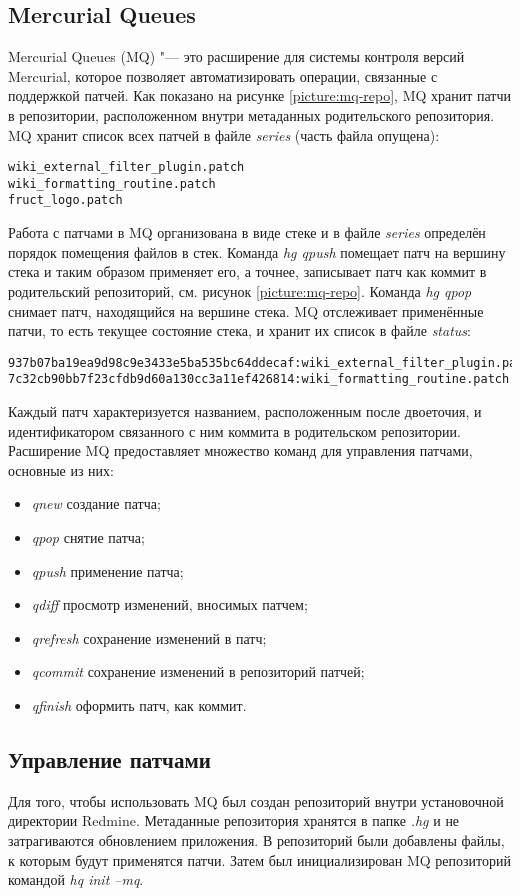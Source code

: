\subsection{Mercurial Queues}
Mercurial Queues (MQ) \cite{mq} "--- это расширение для системы контроля версий
Mercurial, которое позволяет автоматизировать операции, связанные с поддержкой
патчей. Как показано на рисунке \ref{picture:mq-repo}, MQ хранит патчи в
репозитории, расположенном внутри метаданных родительского репозитория. MQ
хранит список всех патчей в файле \textit{series} (часть файла опущена):
\small{\begin{lstlisting}
wiki_external_filter_plugin.patch
wiki_formatting_routine.patch
fruct_logo.patch
\end{lstlisting}}
Работа с патчами в MQ организована в виде стеке и в файле \textit{series}
определён порядок помещения файлов в стек. Команда \textit{hg qpush} помещает
патч на вершину стека и таким образом применяет его, а точнее, записывает патч
как коммит в родительский репозиторий, см. рисунок \ref{picture:mq-repo}.
Команда \textit{hg qpop} снимает патч, находящийся на вершине стека. MQ
отслеживает применённые патчи, то есть текущее состояние стека, и хранит их
список в файле \textit{status}:
\small{\begin{lstlisting}
937b07ba19ea9d98c9e3433e5ba535bc64ddecaf:wiki_external_filter_plugin.patch
7c32cb90bb7f23cfdb9d60a130cc3a11ef426814:wiki_formatting_routine.patch
\end{lstlisting}}
Каждый патч характеризуется названием, расположенным после двоеточия, и
идентификатором связанного с ним коммита в родительском репозитории.
Расширение MQ предоставляет множество команд для управления патчами, основные
из них:
\begin{itemize}
  \item \textit{qnew} создание патча;
  \item \textit{qpop} снятие патча;
  \item \textit{qpush} применение патча;
  \item \textit{qdiff} просмотр изменений, вносимых патчем;
  \item \textit{qrefresh} сохранение изменений в патч;
  \item \textit{qcommit} сохранение изменений в репозиторий патчей;
  \item \textit{qfinish} оформить патч, как коммит.
\end{itemize}

\subsection{Управление патчами}
Для того, чтобы использовать MQ был создан репозиторий внутри
установочной директории Redmine. Метаданные репозитория хранятся в папке
\textit{.hg} и не затрагиваются обновлением приложения. В репозиторий
были добавлены файлы, к которым будут применятся патчи. Затем был
инициализирован MQ репозиторий командой \textit{hq init --mq}.

